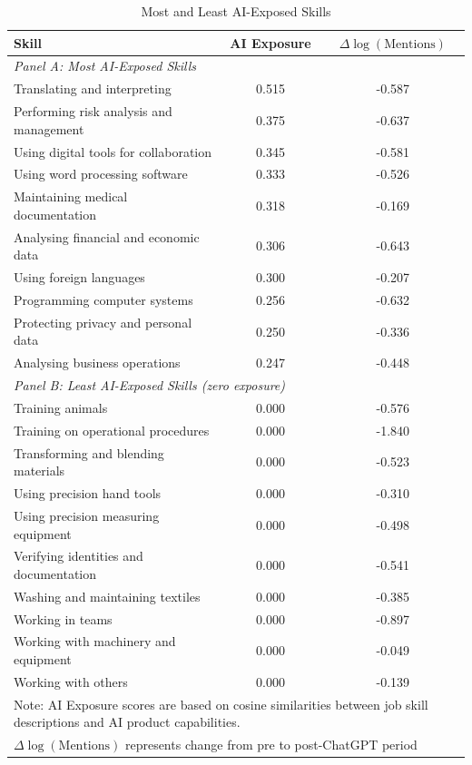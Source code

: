 \documentclass[11pt]{article}
\begin{document}
\begin{table}[H]
\centering
\caption{Most and Least AI-Exposed Skills}
\begin{tabular}{lcc}
\hline\hline
Skill & AI Exposure & $\Delta \log(\text{Mentions})$ \\
\midrule
\multicolumn{3}{l}{\textit{Panel A: Most AI-Exposed Skills}} \\
\midrule
Translating and interpreting & 0.515 & -0.587 \\
Performing risk analysis and management & 0.375 & -0.637 \\
Using digital tools for collaboration & 0.345 & -0.581 \\
Using word processing software & 0.333 & -0.526 \\
Maintaining medical documentation & 0.318 & -0.169 \\
Analysing financial and economic data & 0.306 & -0.643 \\
Using foreign languages & 0.300 & -0.207 \\
Programming computer systems & 0.256 & -0.632 \\
Protecting privacy and personal data & 0.250 & -0.336 \\
Analysing business operations & 0.247 & -0.448 \\
\midrule
\multicolumn{3}{l}{\textit{Panel B: Least AI-Exposed Skills (zero exposure)}} \\
\midrule
Training animals & 0.000 & -0.576 \\
Training on operational procedures & 0.000 & -1.840 \\
Transforming and blending materials & 0.000 & -0.523 \\
Using precision hand tools & 0.000 & -0.310 \\
Using precision measuring equipment & 0.000 & -0.498 \\
Verifying identities and documentation & 0.000 & -0.541 \\
Washing and maintaining textiles & 0.000 & -0.385 \\
Working in teams & 0.000 & -0.897 \\
Working with machinery and equipment & 0.000 & -0.049 \\
Working with others & 0.000 & -0.139 \\
\hline\hline
\multicolumn{3}{l}{\footnotesize Note: AI Exposure scores are based on cosine similarities between job skill descriptions and AI product capabilities.} \\
\multicolumn{3}{l}{\footnotesize $\Delta \log(\text{Mentions})$ represents change from pre to post-ChatGPT period} \\
\end{tabular}
\label{table:skill_exposure}
\end{table}
\end{document}

